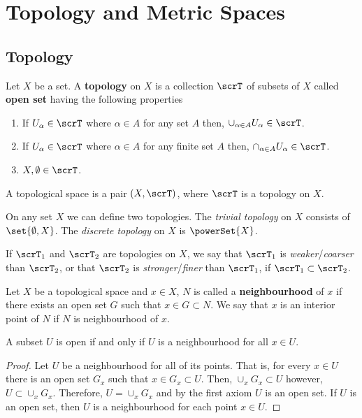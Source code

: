 
\chapter{Topology and Metric Spaces}
\thispagestyle{headings}
\section{Topology}

Let \(X\) be a set. A \textbf{topology} on \(X\) is a collection \(\scrT\)  of subsets of \(X\) called \textbf{open set} having the following properties
\begin{enumerate}
    \item If \(U_{\alpha} \in \scrT\) where \(\alpha \in A\) for any set \(A\) then, \(\cup_{\alpha \in A} U_{\alpha} \in \scrT\).
    \item If \(U_{\alpha} \in \scrT\) where \(\alpha \in A\) for any finite set \(A\) then, \(\cap_{\alpha \in A} U_{\alpha} \in \scrT\).
    \item \(X,\emptyset \in \scrT\).
\end{enumerate}
A topological space is a pair \((X,\scrT)\), where \(\scrT\) is a topology on \(X\).

\begin{example}
    On any set \(X\) we can define two topologies. The \textit{trivial topology} on \(X\) consists of \(\set{\emptyset, X}\). The \textit{discrete topology} on \(X\) is \(\powerSet{X}\).
\end{example}

If \(\scrT_1\) and \(\scrT_2\) are topologies on \(X\), we say that \(\scrT_1\) is \textit{weaker}/\textit{coarser} than \(\scrT_2\), or that \(\scrT_2\) is \textit{stronger}/\textit{finer} than \(\scrT_1\), if \(\scrT_1 \subset \scrT_2\).

\begin{definition}
    Let \(X\) be a topological space and \(x \in X\), \(N\) is called a \textbf{neighbourhood} of \(x\) if there exists an open set \(G\) such that \(x \in G \subset N\). We say that \(x\) is an interior point of \(N\) if \(N\) is neighbourhood of \(x\).
\end{definition}

\begin{proposition}
    A subset \(U\) is open if and only if \(U\) is a neighbourhood for all \(x \in U\).
\end{proposition}

\begin{proof}
    Let \(U\) be a neighbourhood for all of its points. That is, for every \(x \in U\) there is an open set \(G_x\) such that \(x \in G_x \subset U\). Then, \(\cup_x G_x \subset U\) however, \(U \subset \cup_x G_x\). Therefore, \(U = \cup_x G_x\) and by the first axiom \(U\) is an open set. If \(U\) is an open set, then \(U\) is a neighbourhood for each point \(x \in U\).
\end{proof}

